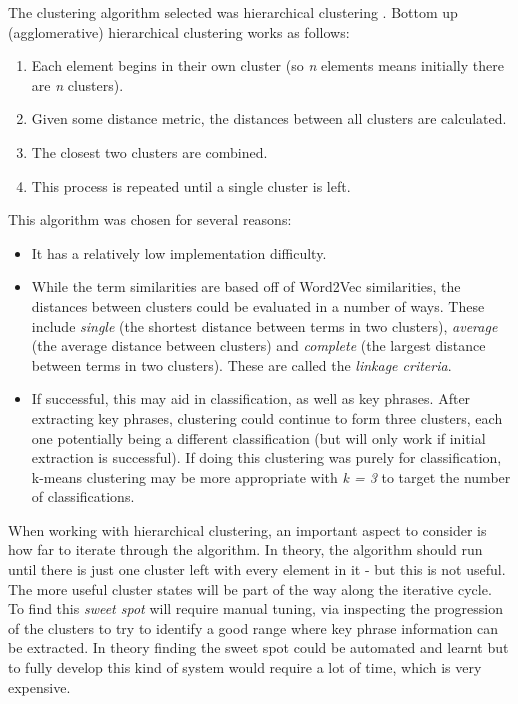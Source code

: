 The clustering algorithm selected was hierarchical clustering \cite{Rai2010}. Bottom up (agglomerative) hierarchical clustering works as follows:
\begin{enumerate}
	\item Each element begins in their own cluster (so \textit{n} elements means initially there are \textit{n} clusters).
	\item Given some distance metric, the distances between all clusters are calculated.
	\item The closest two clusters are combined.
	\item This process is repeated until a single cluster is left.
\end{enumerate}
\noindent This algorithm was chosen for several reasons:
\begin{itemize}
	\item It has a relatively low implementation difficulty.
	\item While the term similarities are based off of Word2Vec similarities, the distances between clusters could be evaluated in a number of ways. These include \textit{single} (the shortest distance between terms in two clusters), \textit{average} (the average distance between clusters) and \textit{complete} (the largest distance between terms in two clusters). These are called the \textit{linkage criteria}.
	\item If successful, this may aid in classification, as well as key phrases. After extracting key phrases, clustering could continue to form three clusters, each one potentially being a different classification (but will only work if initial extraction is successful). If doing this clustering was purely for classification, k-means clustering may be more appropriate with \textit{k = 3} to target the number of classifications.
\end{itemize}

When working with hierarchical clustering, an important aspect to consider is how far to iterate through the algorithm. In theory, the algorithm should run until there is just one cluster left with every element in it - but this is not useful. The more useful cluster states will be part of the way along the iterative cycle. To find this \textit{sweet spot} will require manual tuning, via inspecting the progression of the clusters to try to identify a good range where key phrase information can be extracted. In theory finding the sweet spot could be automated and learnt but to fully develop this kind of system would require a lot of time, which is very expensive.

